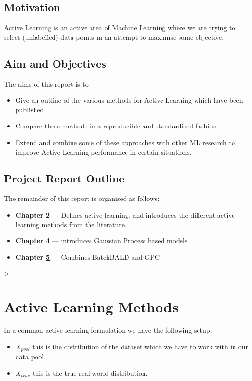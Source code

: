 \documentclass[12pt, a4paper]{report}
\theoremstyle{definition}
\begin{document}
\section{Motivation}

Active Learning is an active area of Machine Learning where we are trying to select (unlabelled) data points in an attempt to maximise some objective.
\section{Aim and Objectives}

The aims of this report is to

\begin{itemize}
    \item Give an outline of the various methods for Active Learning which have been published
    \item Compare these methods in a reproducible and standardised fashion
    \item Extend and combine some of these approaches with other ML research to improve Active Learning performance in certain situations.
\end{itemize}
\section{Project Report Outline}
The remainder of this report is organised as follows:
\begin{itemize}
    \item[] \textbf{Chapter} \hyperref[Chap2]{\textbf{2}} --- Defines active learning, and introduces the different active learning methods from the literature.
    \item[] \textbf{Chapter} \hyperref[Chap4]{\textbf{4}} --- introduces Gaussian Process based models
    \item[] \textbf{Chapter} \hyperref[Chap5]{\textbf{5}} --- Combines BatchBALD and GPC
\end{itemize}
>

\chapter{Active Learning Methods}
\label{Chap2}

In a common active learning formulation we have the following setup.

\begin{itemize}
    \item $X_{pool}$ this is the distribution of the dataset which we have to work with in our data pool.
    \item $X_{true}$ this is the true real world distribution.
\end{itemize}
\end{document}
